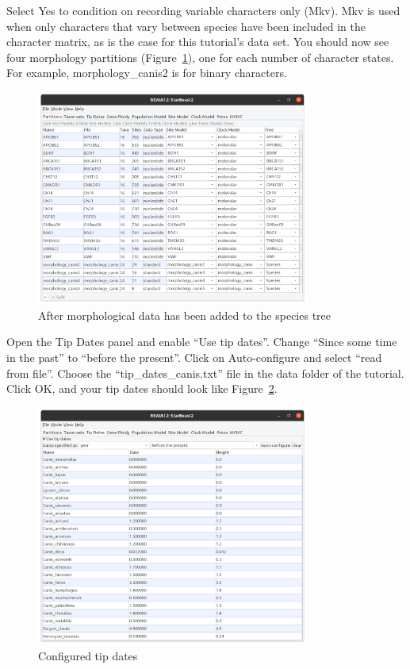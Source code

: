 \documentclass[12pt]{article}
\begin{document}
Select Yes to condition on recording variable characters only (Mkv). Mkv is
used when only characters that vary between species have been included in the
character matrix, as is the case for this tutorial's data set. You
should now see four morphology partitions
(Figure~\ref{fig:morphologyPartitions}), one for each number of character
states. For example, morphology\_canis2 is for binary characters.

\begin{figure}[htb!]
\centering
\includegraphics[width=0.8\textwidth]{figures/morphologyPartitions.png}
\caption
{After morphological data has been added to the species tree}
\label{fig:morphologyPartitions}
\end{figure}

\clearpage

Open the Tip Dates panel and enable ``Use tip dates''. Change
``Since some time in the past'' to ``before the present''. Click
on Auto-configure and select ``read from file''. Choose the
``tip\_dates\_canis.txt'' file in the data folder of the tutorial.
Click OK, and your tip dates should look like Figure~\ref{fig:tipDates}.

\begin{figure}[htb!]
\centering
\includegraphics[width=0.8\textwidth]{figures/tipDates.png}
\caption
{Configured tip dates}
\label{fig:tipDates}
\end{figure}
\end{document}
